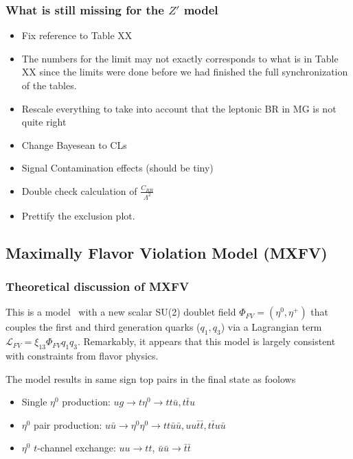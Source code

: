 \subsubsection{What is still missing for the $Z'$ model}
\begin{itemize}
\item Fix reference to Table XX
\item The numbers for the limit may not exactly corresponds to what is in Table XX since
the limits were done before we had finished the full synchronization of the tables.
\item Rescale everything to take into account that the leptonic BR in MG is not quite right
\item Change Bayesean to CLs
\item Signal Contamination effects (should be tiny)
\item Double check calculation of $\frac{C_{RR}}{\Lambda^2}$
\item Prettify the exclusion plot.
\end{itemize}


\clearpage


\subsection{Maximally Flavor Violation Model (MXFV)}
\label{sec:mxfv}

\subsubsection{Theoretical discussion of MXFV}
\label{sec:mxfvtheory}

This is a model~\cite{mxflv1,mxflv2,mxflv3} with a new scalar 
SU(2) doublet field $\Phi_{FV} = (\eta^0,\eta^+)$ that couples the first and third 
generation quarks ($q_1,q_3$) via a Lagrangian term 
$\mathcal{L}_{FV} = \xi_{13} \Phi_{FV} q_1 q_3$.  Remarkably, it appears that this
model is largely consistent with constraints from flavor physics.

The model results in same sign top pairs in the final state as foolows
\begin{itemize}

\item Single $\eta^0$ production: $ug \to t\eta^0 \to tt\bar{u}, t\bar{t}u$

\item $\eta^0$ pair production: $u \bar{u} \to \eta^0 \eta^0 \to tt\bar{u}\bar{u},
uu\bar{t}\bar{t}, t\bar{t}u\bar{u}$

\item $\eta^0$ $t$-channel exchange: $uu \to tt$, $\bar{u}\bar{u} \to \bar{t}\bar{t}$
\end{itemize}

